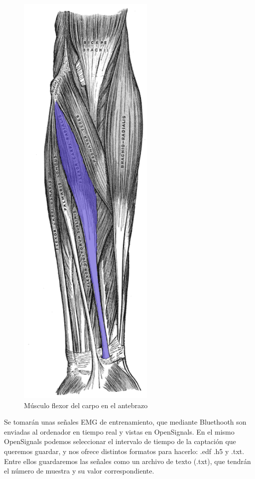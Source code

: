 \begin{figure}[H]
	\center
	\includegraphics[scale=0.5]{imagenes/Disenodelsistema/flexor.png}
	\caption{Músculo flexor del carpo en el antebrazo}
	\label{fig:flexor}
\end{figure}


Se tomarán unas señales EMG de entrenamiento, que mediante Bluethooth son enviadas al ordenador en tiempo real y vistas en OpenSignals. En el mismo OpenSignals podemos seleccionar el intervalo de tiempo de la captación que queremos guardar, y nos ofrece distintos formatos para hacerlo: .edf .h5 y .txt. Entre ellos guardaremos las señales como un archivo de texto (.txt), que tendrán el número de muestra y su valor correspondiente.\newline 

